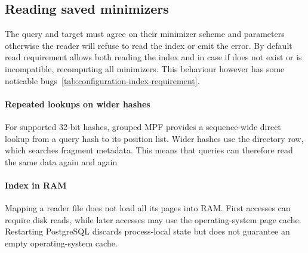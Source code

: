 \subsection{Reading saved minimizers}
\label{sec:index-read-policy}

The query and target must agree on their minimizer scheme and parameters otherwise the reader will refuse to read the index or emit the error.
By default read requirement allows both reading the index and in case if does not exist or is incompatible, recomputing all minimizers. This behaviour however has some noticable bugs~\ref{tab:configuration-index-requirement}.

\paragraph{Repeated lookups on wider hashes}
\label{sec:index-direct-lookup}
\label{sec:index-control-scan-waves}
For supported 32-bit hashes, grouped MPF provides a sequence-wide
direct lookup from a query hash to its position list. Wider hashes use the
directory row, which searches fragment metadata. This means that queries
can therefore read the same data again and again

\paragraph{Index in RAM}
\label{sec:index-residency}
Mapping a reader file does not load all its pages into RAM. First accesses
can require disk reads, while later accesses may use the operating-system
page cache. Restarting PostgreSQL discards process-local state but does not
guarantee an empty operating-system cache.

